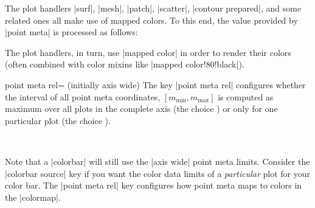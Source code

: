 The plot handlers |surf|, |mesh|, |patch|, |scatter|, |contour prepared|, and
some related ones all make use of mapped colors. To this end, the value
provided by |point meta| is processed as follows:
%
%
The plot handlers, in turn, use |mapped color| in order to render their colors
(often combined with color mixins like |mapped color!80!black|).

\begin{pgfplotskey}{point meta rel= (initially axis wide)}
    The key |point meta rel| configures whether the interval of all point meta
    coordinates, $[m_{\min},m_{\max}]$ is computed as maximum over all plots in
    the complete axis (the choice ) or only for one
    particular plot (the choice ).

%
\begin{codeexample}[]
~
\end{codeexample}

    Note that a |colorbar| will still use the |axis wide| point meta limits.
    Consider the |colorbar source| key if you want the color data limits of a
    \emph{particular} plot for your color bar. The |point meta rel| key
    configures how point meta maps to colors in the |colormap|.
\end{pgfplotskey}

